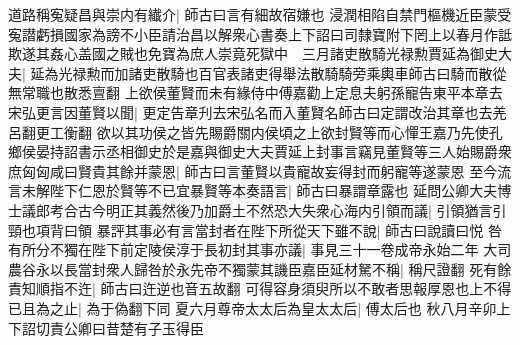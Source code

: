 道路稱寃疑昌與崇内有纎介|{
	師古曰言有細故宿嫌也}
浸潤相陷自禁門樞機近臣蒙受寃譛虧損國家為謗不小臣請治昌以解衆心書奏上下詔曰司隸寶附下罔上以春月作詆欺遂其姦心盖國之賊也免寶為庶人崇竟死獄中　三月諸吏散騎光禄勲賈延為御史大夫|{
	延為光禄勲而加諸吏散騎也百官表諸吏得舉法散騎騎旁乘輿車師古曰騎而散從無常職也散悉亶翻}
上欲侯董賢而未有緣侍中傅嘉勸上定息夫躬孫寵告東平本章去宋弘更言因董賢以聞|{
	更定告章刋去宋弘名而入董賢名師古曰定謂改治其章也去羌呂翻更工衡翻}
欲以其功侯之皆先賜爵關内侯頃之上欲封賢等而心憚王嘉乃先使孔鄉侯晏持詔書示丞相御史於是嘉與御史大夫賈延上封事言竊見董賢等三人始賜爵衆庶匈匈咸曰賢貴其餘并蒙恩|{
	師古曰言董賢以貴寵故妄得封而躬寵等遂蒙恩}
至今流言未解陛下仁恩於賢等不已宜暴賢等本奏語言|{
	師古曰暴謂章露也}
延問公卿大夫博士議郎考合古今明正其義然後乃加爵土不然恐大失衆心海内引領而議|{
	引領猶言引頸也項背曰領}
暴評其事必有言當封者在陛下所從天下雖不說|{
	師古曰說讀曰悦}
咎有所分不獨在陛下前定陵侯淳于長初封其事亦議|{
	事見三十一卷成帝永始二年}
大司農谷永以長當封衆人歸咎於永先帝不獨蒙其譏臣嘉臣延材駑不稱|{
	稱尺證翻}
死有餘責知順指不迕|{
	師古曰迕逆也音五故翻}
可得容身須臾所以不敢者思報厚恩也上不得已且為之止|{
	為于偽翻下同}
夏六月尊帝太太后為皇太太后|{
	傅太后也}
秋八月辛卯上下詔切責公卿曰昔楚有子玉得臣

